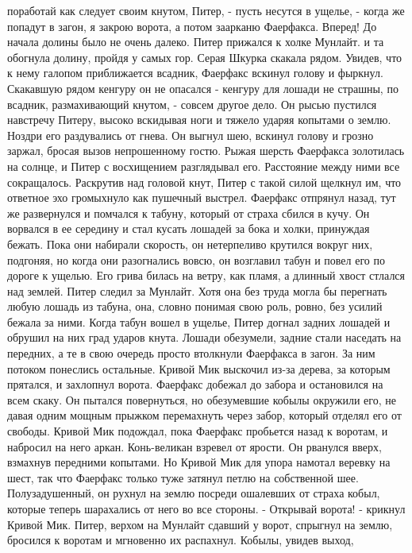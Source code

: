 поработай как следует своим кнутом, Питер, - пусть несутся в ущелье, - 
когда же попадут в загон, я закрою ворота, а потом заарканю Фаерфакса. 
Вперед!
    До начала долины было не очень далеко. Питер прижался к холке 
Мунлайт. и та обогнула долину, пройдя у самых гор. Серая Шкурка 
скакала рядом.
    Увидев, что к нему галопом приближается всадник, Фаерфакс вскинул 
голову и фыркнул. Скакавшую рядом кенгуру он не опасался - кенгуру для 
лошади не страшны, по всадник, размахивающий кнутом, - совсем другое 
дело.
    Он рысью пустился навстречу Питеру, высоко вскидывая ноги и тяжело 
ударяя копытами о землю. Ноздри его раздувались от гнева. Он выгнул 
шею, вскинул голову и грозно заржал, бросая вызов непрошенному гостю. 
Рыжая шерсть Фаерфакса золотилась на солнце, и Питер с восхищением 
разглядывал его. Расстояние между ними все сокращалось.
    Раскрутив над головой кнут, Питер с такой силой щелкнул им, что 
ответное эхо громыхнуло как пушечный выстрел. Фаерфакс отпрянул назад, 
тут же развернулся и помчался к табуну, который от страха сбился в 
кучу. Он ворвался в ее середину и стал кусать лошадей за бока и холки, 
принуждая бежать. Пока они набирали скорость, он нетерпеливо крутился 
вокруг них, подгоняя, но когда они разогнались вовсю, он возглавил 
табун и повел его по дороге к ущелью. Его грива билась на ветру, как 
пламя, а длинный хвост стлался над землей.
    Питер следил за Мунлайт. Хотя она без труда могла бы перегнать 
любую лошадь из табуна, она, словно понимая свою роль, ровно, без 
усилий бежала за ними.
    Когда табун вошел в ущелье, Питер догнал задних лошадей и обрушил 
на них град ударов кнута. Лошади обезумели, задние стали наседать на 
передних, а те в свою очередь просто втолкнули Фаерфакса в загон. За 
ним потоком понеслись остальные. Кривой Мик выскочил из-за дерева, за 
которым прятался, и захлопнул ворота.
    Фаерфакс добежал до забора и остановился на всем скаку. Он пытался 
повернуться, но обезумевшие кобылы окружили его, не давая одним мощным 
прыжком перемахнуть через забор, который отделял его от свободы.
    Кривой Мик подождал, пока Фаерфакс пробьется назад к воротам, и 
набросил на него аркан. Конь-великан взревел от ярости. Он рванулся 
вверх, взмахнув передними копытами. Но Кривой Мик для упора намотал 
веревку на шест, так что Фаерфакс только туже затянул петлю на 
собственной шее. Полузадушенный, он рухнул на землю посреди ошалевших 
от страха кобыл, которые теперь шарахались от него во все стороны.
    - Открывай ворота! - крикнул Кривой Мик.
    Питер, верхом на Мунлайт сдавший у ворот, спрыгнул на землю, 
бросился к воротам и мгновенно их распахнул. Кобылы, увидев выход, 
